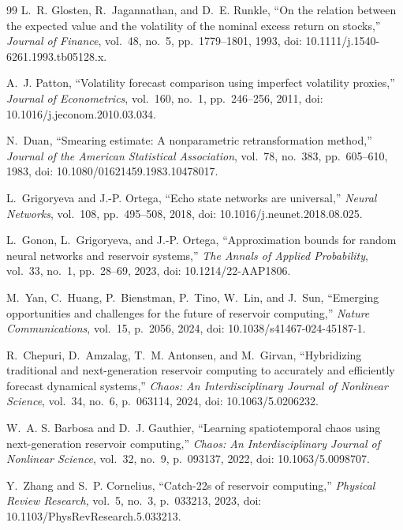 \documentclass[aip,cha,reprint,amsmath,amssymb]{revtex4-2}
\begin{document}
\begin{thebibliography}{99}
L.~R. Glosten, R.~Jagannathan, and D.~E. Runkle, ``On the relation between the expected value and the volatility of the nominal excess return on stocks,'' \emph{Journal of Finance}, vol.~48, no.~5, pp.~1779--1801, 1993, doi: 10.1111/j.1540-6261.1993.tb05128.x.

A.~J. Patton, ``Volatility forecast comparison using imperfect volatility proxies,'' \emph{Journal of Econometrics}, vol.~160, no.~1, pp.~246--256, 2011, doi: 10.1016/j.jeconom.2010.03.034.

N.~Duan, ``Smearing estimate: A nonparametric retransformation method,'' \emph{Journal of the American Statistical Association}, vol.~78, no.~383, pp.~605--610, 1983, doi: 10.1080/01621459.1983.10478017.

L.~Grigoryeva and J.-P. Ortega, ``Echo state networks are universal,'' \emph{Neural Networks}, vol.~108, pp.~495--508, 2018, doi: 10.1016/j.neunet.2018.08.025.

L.~Gonon, L.~Grigoryeva, and J.-P. Ortega, ``Approximation bounds for random neural networks and reservoir systems,'' \emph{The Annals of Applied Probability}, vol.~33, no.~1, pp.~28--69, 2023, doi: 10.1214/22-AAP1806.

M.~Yan, C.~Huang, P.~Bienstman, P.~Tino, W.~Lin, and J.~Sun, ``Emerging opportunities and challenges for the future of reservoir computing,'' \emph{Nature Communications}, vol.~15, p.~2056, 2024, doi: 10.1038/s41467-024-45187-1.

R.~Chepuri, D.~Amzalag, T.~M. Antonsen, and M.~Girvan, ``Hybridizing traditional and next-generation reservoir computing to accurately and efficiently forecast dynamical systems,'' \emph{Chaos: An Interdisciplinary Journal of Nonlinear Science}, vol.~34, no.~6, p.~063114, 2024, doi: 10.1063/5.0206232.

W.~A. S. Barbosa and D.~J. Gauthier, ``Learning spatiotemporal chaos using next-generation reservoir computing,'' \emph{Chaos: An Interdisciplinary Journal of Nonlinear Science}, vol.~32, no.~9, p.~093137, 2022, doi: 10.1063/5.0098707.

Y.~Zhang and S.~P. Cornelius, ``Catch-22s of reservoir computing,'' \emph{Physical Review Research}, vol.~5, no.~3, p.~033213, 2023, doi: 10.1103/PhysRevResearch.5.033213.


\end{thebibliography}
\end{document}
